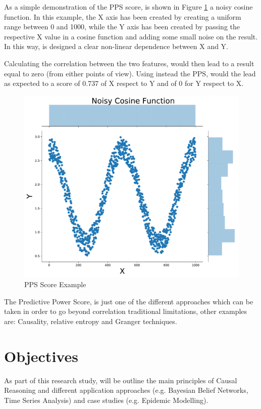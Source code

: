 As a simple demonstration of the PPS score, is shown in Figure \ref{pps_ex} a noisy cosine function. In this example, the X axis has been created by creating a uniform range between 0 and 1000, while the Y axis has been created by passing the respective X value in a cosine function and adding some small noise on the result. In this way, is designed a clear non-linear dependence between X and Y. 

Calculating the correlation between the two features, would then lead to a result equal to zero (from either points of view). Using instead the PPS, would the lead as expected to a score of 0.737 of X respect to Y and of 0 for Y respect to X. 

\begin{figure}[ht!]%
    \centering
    \includegraphics[width=0.45\linewidth]{latex/images/pps_ex.pdf}
    \vspace{-0.2cm}
    \caption{PPS Score Example}
    \label{pps_ex}
\end{figure}

The Predictive Power Score, is just one of the different approaches which can be taken in order to go beyond correlation traditional limitations, other examples are: Causality, relative entropy and Granger techniques.

\section{Objectives}
\vspace{-0.1cm}
As part of this research study, will be outline the main principles of Causal Reasoning and different application approaches (e.g. Bayesian Belief Networks, Time Series Analysis) and case studies (e.g. Epidemic Modelling). 